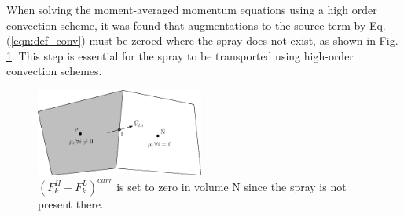 \documentclass[a4paper,10pt]{article}
\begin{document}
When solving the moment-averaged momentum equations using a high order convection scheme, it was found that augmentations to the source term by Eq. (\ref{eqn:def_conv}) must be zeroed where the spray does not exist, as shown in Fig. \ref{fig:zero_def_conv}. This step is essential for the spray to be transported using high-order convection schemes.
\begin{figure}[H]
\centering
\includegraphics[width=0.49\textwidth]{vel_interp.eps}
\caption{$(F_k^H - F_k^L)^{curr}$ is set to zero in volume $\mathrm{N}$ since the spray is not present there.}
\label{fig:zero_def_conv}
\end{figure}
\end{document}
